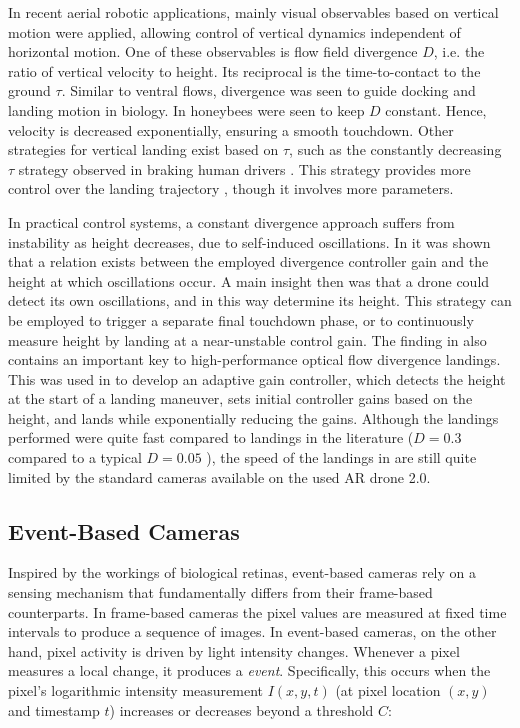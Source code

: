 In recent aerial robotic applications, mainly visual observables based on vertical motion were applied, allowing control of vertical dynamics independent of horizontal motion. One of these observables is flow field divergence $D$, i.e. the ratio of vertical velocity to height. Its reciprocal is the time-to-contact to the ground $\tau$. Similar to ventral flows, divergence was seen to guide docking and landing motion in biology. In \cite{Baird2013} honeybees were seen to keep $D$ constant. Hence, velocity is decreased exponentially, ensuring a smooth touchdown. Other strategies for vertical landing exist based on $\tau$, such as the constantly decreasing $\tau$ strategy observed in braking human drivers \cite{Lee1976}. This strategy provides more control over the landing trajectory \cite{Alkowatly2015}, though it involves more parameters.

In practical control systems, a constant divergence approach suffers from instability as height decreases, due to self-induced oscillations. In \citet{DeCroon2016} it was shown that a relation exists between the employed divergence controller gain and the height at which oscillations occur. A main insight then was that a drone could detect its own oscillations, and in this way determine its height. This strategy can be employed to trigger a separate final touchdown phase, or to continuously measure height by landing at a near-unstable control gain. The finding in \citet{DeCroon2016} also contains an important key to high-performance optical flow divergence landings. This was used in \citet{Ho2016a} to develop an adaptive gain controller, which detects the height at the start of a landing maneuver, sets initial controller gains based on the height, and lands while exponentially reducing the gains. Although the landings performed were quite fast compared to landings in the literature ($D=0.3$ compared to a typical $D=0.05$ \cite{Herisse2012}), the speed of the landings in \citet{Ho2016a} are still quite limited by the standard cameras available on the used AR drone 2.0.

\subsection{Event-Based Cameras}
\label{sec:related_event_cams}
Inspired by the workings of biological retinas, event-based cameras rely on a sensing mechanism that fundamentally differs from their frame-based counterparts. In frame-based cameras the pixel values are measured at fixed time intervals to produce a sequence of images. In event-based cameras, on the other hand, pixel activity is driven by light intensity changes. Whenever a pixel measures a local change, it produces a \emph{event}. Specifically, this occurs when the pixel's logarithmic intensity measurement $I(x,y,t)$ (at pixel location $(x,y)$ and timestamp $t$) increases or decreases beyond a threshold $C$:

